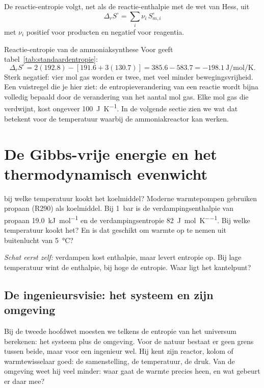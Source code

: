 De reactie-entropie volgt, net als de reactie-enthalpie met de wet van Hess, uit
\begin{equation}
\boxed{\Delta_r S^\circ = \sum_i \nu_i\,S_{m,i}^\circ}
\label{eq:reactie-entropie}
\end{equation}
met $\nu_i$ positief voor producten en negatief voor reagentia.

\begin{voorbeeld}{Reactie-entropie van de ammoniaksynthese}
Voor  geeft tabel~\ref{tab:standaardentropie}:
\[
\Delta_r S^\circ = 2(192.8) - [191.6 + 3(130.7)] = 385.6 - 583.7 = \SI{-198.1}{\joule\per\mole\per\kelvin}.
\]
Sterk negatief: vier mol gas worden er twee, met veel minder bewegingsvrijheid. Een vuistregel die je hier ziet: de entropieverandering van een reactie wordt bijna volledig bepaald door de verandering van het aantal mol gas. Elke mol gas die verdwijnt, kost ongeveer \SI{100}{\joule\per\kelvin}. In de volgende sectie zien we wat dat betekent voor de temperatuur waarbij de ammoniakreactor kan werken.
\end{voorbeeld}

\section{De Gibbs-vrije energie en het thermodynamisch evenwicht}
\label{sec:gibbs}

\begin{casus}{bij welke temperatuur kookt het koelmiddel?}
Moderne warmtepompen gebruiken propaan (R290) als koelmiddel. Bij \SI{1}{\bar} is de verdampingsenthalpie van propaan \SI{19.0}{\kilo\joule\per\mole} en de verdampingsentropie \SI{82}{\joule\per\mole\per\kelvin}. Bij welke temperatuur kookt het? En is dat geschikt om warmte op te nemen uit buitenlucht van \SI{5}{\celsius}?

\emph{Schat eerst zelf:} verdampen kost enthalpie, maar levert entropie op. Bij lage temperatuur wint de enthalpie, bij hoge de entropie. Waar ligt het kantelpunt?
\end{casus}


\subsection{De ingenieursvisie: het systeem en zijn omgeving}

Bij de tweede hoofdwet moesten we telkens de entropie van het universum berekenen: het systeem plus de omgeving. Voor de natuur bestaat er geen grens tussen beide, maar voor een ingenieur wel. Hij kent zijn reactor, kolom of warmtewisselaar goed: de samenstelling, de temperatuur, de druk. Van de omgeving weet hij veel minder: waar gaat de warmte precies heen, en wat gebeurt er daar mee?

